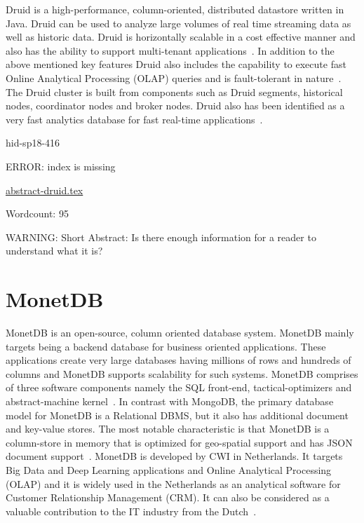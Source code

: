 Druid is a high-performance, column-oriented, distributed datastore written in
Java. Druid can be used to analyze large volumes of real time streaming data as
well as historic data. Druid is horizontally scalable in a cost effective manner
and also has the ability to support multi-tenant
applications~\cite{hid-sp18-416-www-druid-wikipedia}. In addition to the above
mentioned key features Druid also includes the capability to execute fast Online
Analytical Processing (OLAP) queries and is fault-tolerant in
nature~\cite{hid-sp18-416-www-about-druid}. The Druid cluster is built from
components such as Druid segments, historical nodes, coordinator nodes and
broker nodes.  Druid also has been identified as a very fast analytics database
for fast real-time
applications~\cite{hid-sp18-416-www-fast-dataanalytics-druid-blog}.


\begin{IU}

hid-sp18-416

ERROR: index is missing

\href{https://github.com/cloudmesh-community/hid-sp18-416/blob/master//technology/abstract-druid.tex}{abstract-druid.tex}

 

Wordcount: 95

WARNING: Short Abstract: Is there enough information for a reader to understand what it is?

\end{IU}

\section{MonetDB}

MonetDB is an open-source, column oriented database system. MonetDB
mainly targets being a backend database for business oriented
applications. These applications create very large databases having
millions of rows and hundreds of columns and MonetDB supports
scalability for such systems. MonetDB comprises of three software
components namely the SQL front-end, tactical-optimizers and
abstract-machine kernel~\cite{hid-sp18-416-www-monetdb-features}. In
contrast with MongoDB, the primary database model for MonetDB is a
Relational DBMS, but it also has additional document and key-value
stores. The most notable characteristic is that MonetDB is a
column-store in memory that is optimized for geo-spatial support and
has JSON document
support~\cite{hid-sp18-416-www-monetdb-mongodb-comparison}. MonetDB is
developed by CWI in Netherlands. It targets Big Data and Deep Learning
applications and Online Analytical Processing (OLAP) and it is widely
used in the Netherlands as an analytical software for Customer
Relationship Management (CRM). It can also be considered as a valuable
contribution to the IT industry from the
Dutch~\cite{hid-sp18-416-www-monetdb-dutch}.


